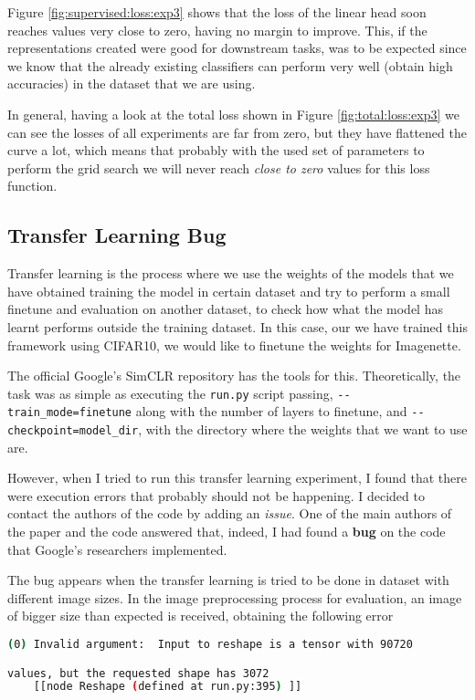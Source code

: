 Figure \ref{fig:supervised:loss:exp3} shows that the loss of the linear head soon reaches values very close to zero, having no margin to improve. This, if the representations created were good for downstream tasks, was to be expected since we know that the already existing  classifiers can perform very well (obtain high accuracies) in the dataset that we are using.

In general, having a look at the total loss shown in Figure \ref{fig:total:loss:exp3} we can see the losses of all experiments are far from zero, but they have flattened the curve a lot, which means that probably with the used set of parameters to perform the grid search we will never reach \emph{close to zero} values for this loss function.

\subsection{Transfer Learning Bug}

Transfer learning is the process where we use the weights of the models that we have obtained training the model in certain dataset and try to perform a small finetune and evaluation on another dataset, to check how what the model has learnt performs outside the training dataset. In this case, our we have trained this framework using CIFAR10, we would like to finetune the weights for Imagenette.

The official Google's SimCLR repository has the tools for this. Theoretically, the task was as simple as executing the \lstinline{run.py} script passing, \lstinline{--train_mode=finetune} along with the number of layers to finetune,  and \lstinline{--checkpoint=model_dir}, with the directory where the weights that we want to use are.

However, when I tried to run this transfer learning experiment, I found that there were execution errors that probably should not be happening. I decided to contact the authors of the code by adding an \emph{issue}\footnotemark. One of the main authors of the paper and the code answered that, indeed, I had found a \textbf{bug} on the code that Google's researchers implemented.



The bug appears when the transfer learning is tried to be done in dataset with different image sizes. In the image preprocessing process for evaluation, an image of bigger size than expected is received, obtaining the following error
\begin{lstlisting}[language=bash,caption={Error obtained in transfer learning.}]
(0) Invalid argument:  Input to reshape is a tensor with 90720

values, but the requested shape has 3072
    [[node Reshape (defined at run.py:395) ]]
\end{lstlisting}

